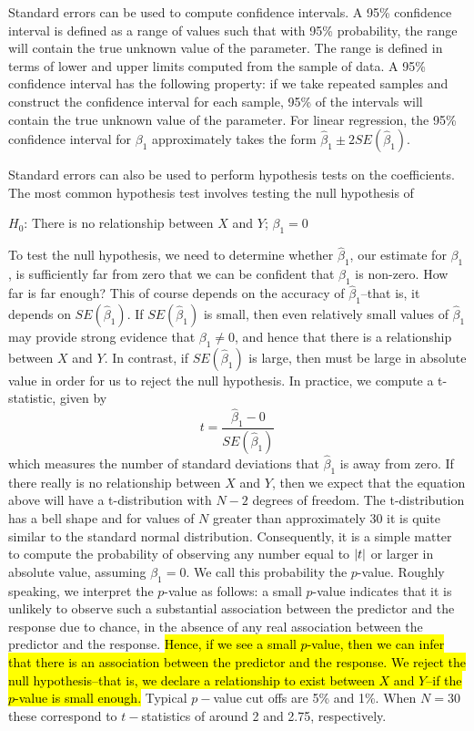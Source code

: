 Standard errors can be used to compute confidence intervals. 
A 95\% confidence interval is defined as a range of values such that with 95\% 
probability, the range will contain the true unknown value of the parameter. 
The range is defined in terms of lower and upper limits computed from the 
sample of data. A 95\% confidence interval has the following property: 
if we take repeated samples and construct the confidence interval for each 
sample, 95\% of the intervals will contain the true unknown 
value of the parameter. For linear regression, the 95\% 
confidence interval for $\beta_1$
approximately takes the form $\hat \beta_1 \pm 2 SE(\hat \beta_1)$.

Standard errors can also be used to perform hypothesis tests 
on the coefficients. The most common hypothesis test involves testing the null hypothesis of
\begin{center}
$H_0$: There is no relationship between $X$ and $Y$; $\beta_1=0$
\end{center}
To test the null hypothesis, we need to determine whether 
$\hat \beta_1$, our estimate for $\beta_1$, is sufficiently 
far from zero that we can be confident that $\beta_1$ is non-zero. 
How far is far enough? This of course depends on the 
accuracy of $\hat \beta_1$--that is, it depends on $SE(\hat \beta_1)$. 
If $SE(\hat \beta_1)$ is small, then even relatively small values of $\hat \beta_1$ 
may provide strong evidence that $\beta_1 \neq 0$, and hence that there is a relationship 
between $X$ and $Y$. 
In contrast, if $SE(\hat \beta_1)$ is large, then 
must be large in absolute value in order for us to reject the 
null hypothesis. In practice, we compute a t-statistic, given by
\begin{equation}
t = \frac{\hat \beta_1 - 0}{SE(\hat \beta_1)}
\end{equation}
which measures the number of standard 
deviations that $\hat \beta_1$ is away from zero.
If there really is no relationship between $X$ and $Y$, 
then we expect that the equation above will have a t-distribution with $N-2$ 
degrees of freedom. The t-distribution has a bell shape and 
for values of $N$ greater than approximately 30 it is quite similar 
to the standard normal distribution. Consequently, it is a simple 
matter to compute the probability of observing any number
equal to $\lvert{t}\rvert$ or larger in absolute value, assuming $\beta_1=0$. We call 
this probability the $p$-value. Roughly speaking, we interpret the 
$p$-value as follows: a small $p$-value indicates that it is unlikely 
to observe such a substantial association between the 
predictor and the response due to chance, in the absence of 
any real association between the predictor and the response. \hl{Hence, if we
see a small $p$-value, then we can infer that there is 
an association between the predictor and the response.
We reject the null hypothesis--that is, we declare a relationship to 
exist between $X$ and $Y$--if the $p$-value is small enough.}
Typical $p-$value cut offs are 5\% and 1\%. 
When $N=30$ these correspond to $t-$statistics 
of around  2 and 2.75, respectively.


